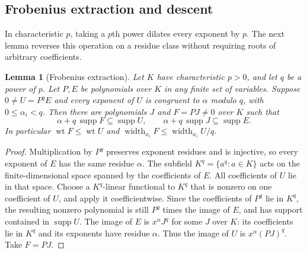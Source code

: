 \documentclass[11pt]{article}
\DeclareMathOperator{\wt}{wt}\DeclareMathOperator{\ord}{ord}
\DeclareMathOperator{\supp}{supp}\DeclareMathOperator{\rank}{rank}
\numberwithin{equation}{section}
\newtheorem{lemma}[theorem]{Lemma}
\theoremstyle{definition}\newtheorem{definition}[theorem]{Definition}
\theoremstyle{remark}\newtheorem{remark}[theorem]{Remark}
\begin{document}
\subsection{Frobenius extraction and descent}

In characteristic $p$, taking a $p$th power dilates every exponent by
$p$. The next lemma reverses this operation on a residue class without
requiring roots of arbitrary coefficients.

\begin{lemma}[Frobenius extraction]
\label{lem:frobenius-extraction}
Let $K$ have characteristic $p>0$, and let $q$ be a power of $p$.
Let $P,E$ be polynomials over $K$ in any finite set of variables.
Suppose $0\ne U=P^qE$ and every
exponent of $U$ is congruent to $\alpha$ modulo $q$, with
$0\le\alpha_i<q$. Then there are polynomials $J$ and $F=PJ\ne0$ over $K$
such that
\[
 \alpha+q\,\supp F\subseteq\supp U,
 \qquad \alpha+q\,\supp J\subseteq\supp E.
\]
In particular $\wt F\le\wt U$ and
$\operatorname{width}_{x_i}F\le\operatorname{width}_{x_i}U/q$.
\end{lemma}
\begin{proof}
Multiplication by $P^q$ preserves exponent residues and is injective,
so every exponent of $E$ has the same residue $\alpha$.
The subfield $K^q=\{a^q:a\in K\}$ acts on the finite-dimensional
space spanned by the coefficients of $E$. All coefficients of $U$
lie in that space. Choose a $K^q$-linear functional to $K^q$ that
is nonzero on one coefficient of $U$, and apply it coefficientwise.
Since the coefficients of $P^q$ lie in $K^q$, the resulting nonzero
polynomial is still $P^q$ times the image of $E$, and has support
contained in $\supp U$.
The image of $E$ is $x^\alpha J^q$ for some $J$ over $K$: its
coefficients lie in $K^q$ and its exponents have residue $\alpha$.
Thus the image of $U$ is $x^\alpha(PJ)^q$. Take $F=PJ$.
\end{proof}
\end{document}
